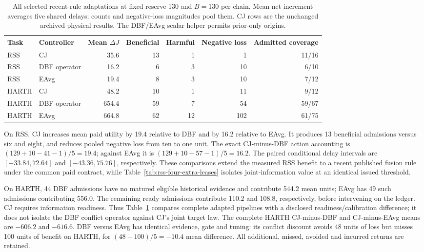 \documentclass[10pt]{article}
\begin{document}
\begin{table}[t]
\centering\small
\caption{All selected recent-rule adaptations at fixed reserve 130 and
$B=130$ per chain. Mean net increment averages five shared delays; counts
and negative-loss magnitudes pool them. CJ rows are the unchanged archived
physical results. The DBF/EAvg scalar helper permits prior-only origins.}
\label{tab:dbf2025-complete-service}
\begin{tabular}{llrrrrr}
\toprule
Task & Controller & Mean $\Delta J$ & Beneficial & Harmful
 & Negative loss & Admitted coverage\\
\midrule
RSS & CJ & 35.6 & 13 & 1 & 1 & 11/16\\
RSS & DBF operator & 16.2 & 6 & 3 & 10 & 6/10\\
RSS & EAvg & 19.4 & 8 & 3 & 10 & 7/12\\
HARTH & CJ & 48.2 & 10 & 1 & 11 & 9/12\\
HARTH & DBF operator & 654.4 & 59 & 7 & 54 & 59/67\\
HARTH & EAvg & 664.8 & 62 & 12 & 102 & 61/75\\
\bottomrule
\end{tabular}
\end{table}

On RSS, CJ increases mean paid utility by 19.4 relative to DBF and by
16.2 relative to EAvg. It produces 13 beneficial admissions versus six
and eight, and reduces pooled negative loss from ten to one unit.
The exact CJ-minus-DBF action accounting is
$(129+10-41-1)/5=19.4$; against EAvg it is
$(129+10-57-1)/5=16.2$. The paired conditional delay intervals are
$[-33.84,72.64]$ and $[-43.36,75.76]$, respectively. These comparisons
extend the measured RSS benefit to a recent published fusion rule under
the common paid contract, while Table~\ref{tab:rss-four-extra-leases}
isolates joint-information value at an identical issued threshold.

On HARTH, 44 DBF admissions have no matured eligible historical evidence
and contribute 544.2 mean units; EAvg has 49 such admissions contributing
556.0. The remaining ready admissions contribute 110.2 and 108.8,
respectively, before intervening on the ledger. CJ requires information
readiness. Thus Table~\ref{tab:dbf2025-complete-service} compares complete
adapted pipelines with a disclosed readiness/calibration difference; it
does not isolate the DBF conflict operator against CJ's joint target law.
The complete HARTH CJ-minus-DBF and CJ-minus-EAvg means are $-606.2$
and $-616.6$. DBF versus EAvg has identical evidence, gate and tuning:
its conflict discount avoids 48 units of loss but misses 100 units of
benefit on HARTH, for $(48-100)/5=-10.4$ mean difference.
All additional, missed, avoided and incurred returns are retained.
\end{document}
